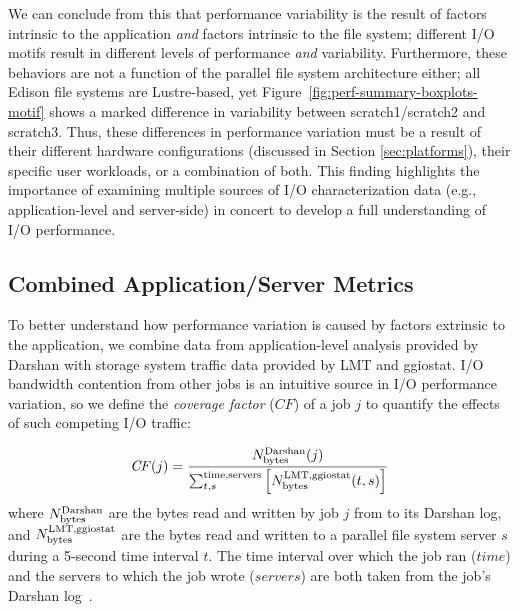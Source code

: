 We can conclude from this that performance variability is the result of factors intrinsic to the application \emph{and} factors intrinsic to the file system;
different I/O motifs result in different levels of performance \emph{and} variability.
Furthermore, these behaviors are not a function of the parallel file system architecture either; all Edison file systems are Lustre-based, yet Figure~\ref{fig:perf-summary-boxplots-motif} shows a marked difference in variability between scratch1/scratch2 and scratch3.
Thus, these differences in performance variation must be a result of their different hardware configurations (discussed in Section \ref{sec:platforms}), their specific user workloads, or a combination of both.
This finding highlights the importance of examining multiple sources of I/O characterization data (e.g., application-level and server-side) in concert to develop a full understanding of I/O performance.

\subsection{Combined Application/Server Metrics} \label{sec:results/combining}

To better understand how performance variation is caused by factors extrinsic to the application, we combine data from application-level analysis provided by Darshan with storage system traffic data provided by LMT and ggiostat.
I/O bandwidth contention from other jobs is an intuitive source in I/O performance variation, so we define the \emph{coverage factor} ($\mathit{CF}$) of a job $j$ to quantify the effects of such competing I/O traffic:

\begin{equation} \label{eq:cf}
    \mathit{CF}(j) = \frac{N_{\textup{bytes}}^{\textup{Darshan}}(j)}
    {\sum_{t,s}^{\textup{time,servers}}
    \left [ N_{\textup{bytes}}^{\textup{LMT,ggiostat}}(t,s) \right ] }
\end{equation}
%
where $N_{\textup{bytes}}^{\textup{Darshan}}$ are the bytes read and written by job $j$ from to its Darshan log, and $N_{\textup{bytes}}^{\textup{LMT,ggiostat}}$ are the bytes read and written to a parallel file system server $s$ during a 5-second time interval $t$.
The time interval over which the job ran ($\mathit{time}$) and the servers to which the job wrote ($\mathit{servers}$) are both taken from the job's Darshan log~\cite{snyder2016modular}.

